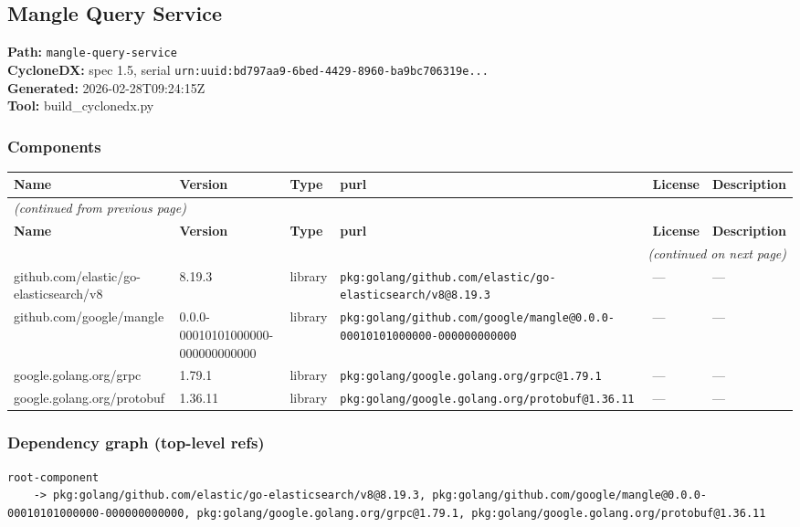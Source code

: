 \documentclass[11pt,a4paper]{article}
\begin{document}
\subsection{Mangle Query Service}
\textbf{Path:} \texttt{mangle-query-service}
\\ \textbf{CycloneDX:} spec 1.5, serial \texttt{urn:uuid:bd797aa9-6bed-4429-8960-ba9bc706319e...}
\\ \textbf{Generated:} 2026-02-28T09:24:15Z
\\ \textbf{Tool:} build\_cyclonedx.py

\subsubsection*{Components}
\begin{longtable}{|p{4cm}|p{2cm}|p{1.6cm}|p{5cm}|p{1.5cm}|p{3.5cm}|}
\toprule
\rowcolor{sbomhdr}\textbf{Name} & \textbf{Version} & \textbf{Type} & \textbf{purl} & \textbf{License} & \textbf{Description} \\
\midrule
\endfirsthead
\multicolumn{6}{l}{\small\itshape (continued from previous page)} \\
\toprule
\rowcolor{sbomhdr}\textbf{Name} & \textbf{Version} & \textbf{Type} & \textbf{purl} & \textbf{License} & \textbf{Description} \\
\midrule
\endhead
\midrule
\multicolumn{6}{r}{\small\itshape (continued on next page)} \\
\endfoot
\bottomrule
\endlastfoot
\raggedright github.com/elastic/go-elasticsearch/v8 & 8.19.3 & library & \small\texttt{pkg:golang/github.com/elastic/go-elasticsearch/v8@8.19.3} & — & \small — \\
\raggedright github.com/google/mangle & 0.0.0-00010101000000-000000000000 & library & \small\texttt{pkg:golang/github.com/google/mangle@0.0.0-00010101000000-000000000000} & — & \small — \\
\raggedright google.golang.org/grpc & 1.79.1 & library & \small\texttt{pkg:golang/google.golang.org/grpc@1.79.1} & — & \small — \\
\raggedright google.golang.org/protobuf & 1.36.11 & library & \small\texttt{pkg:golang/google.golang.org/protobuf@1.36.11} & — & \small — \\
\end{longtable}

\subsubsection*{Dependency graph (top-level refs)}
\begin{lstlisting}[style=depgraph]
  root-component
    -> pkg:golang/github.com/elastic/go-elasticsearch/v8@8.19.3, pkg:golang/github.com/google/mangle@0.0.0-00010101000000-000000000000, pkg:golang/google.golang.org/grpc@1.79.1, pkg:golang/google.golang.org/protobuf@1.36.11
\end{lstlisting}
\end{document}
